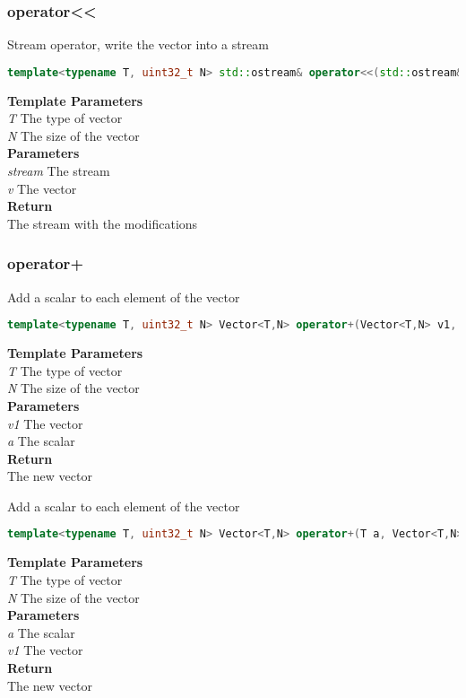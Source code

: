 \subsubsection{operator<<}
\begin{mdframed}
Stream operator, write the vector into a stream
\begin{lstlisting}[language=C++]
template<typename T, uint32_t N> std::ostream& operator<<(std::ostream& stream, const Vector<T,N>& v) 
\end{lstlisting}
\textbf{Template Parameters} \\ 
\textit{T} The type of vector \\ 
\textit{N} The size of the vector \\ 
\textbf{Parameters} \\ 
\textit{stream} The stream \\ 
\textit{v} The vector \\ 
\textbf{Return} \\ 
The stream with the modifications\\ 
\end{mdframed}

\subsubsection{operator+}
\begin{mdframed}
Add a scalar to each element of the vector
\begin{lstlisting}[language=C++]
template<typename T, uint32_t N> Vector<T,N> operator+(Vector<T,N> v1, T a) 
\end{lstlisting}
\textbf{Template Parameters} \\ 
\textit{T} The type of vector \\ 
\textit{N} The size of the vector \\ 
\textbf{Parameters} \\ 
\textit{v1} The vector \\ 
\textit{a} The scalar \\ 
\textbf{Return} \\ 
The new vector\\ 
\end{mdframed}

\begin{mdframed}
Add a scalar to each element of the vector
\begin{lstlisting}[language=C++]
template<typename T, uint32_t N> Vector<T,N> operator+(T a, Vector<T,N> v1) 
\end{lstlisting}
\textbf{Template Parameters} \\ 
\textit{T} The type of vector \\ 
\textit{N} The size of the vector \\ 
\textbf{Parameters} \\ 
\textit{a} The scalar \\ 
\textit{v1} The vector \\ 
\textbf{Return} \\ 
The new vector\\ 
\end{mdframed}

